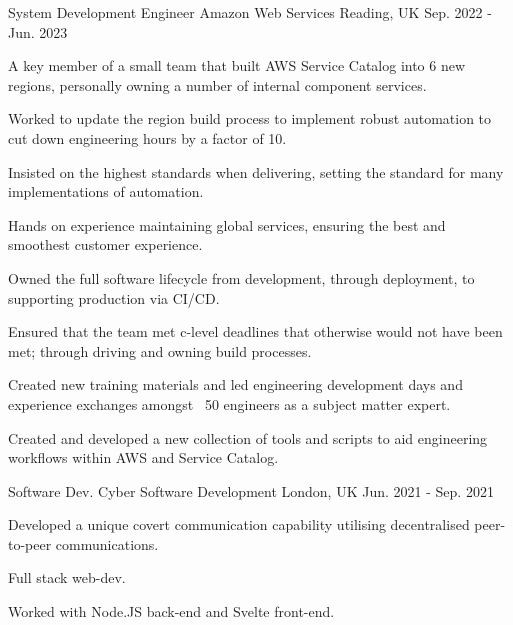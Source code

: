 \begin{cventries}
\cventry
{System Development Engineer} %
{Amazon Web Services} %
{Reading, UK} %
{Sep. 2022 - Jun. 2023} %
{ %
\begin{cvitems}
\item {A key member of a small team that built AWS Service Catalog into 6 new regions, personally owning a number of internal component services.}
\item {Worked to update the region build process to implement robust automation to cut down engineering hours by a factor of 10.}
\item {Insisted on the highest standards when delivering, setting the standard for many implementations of automation.}
\item {Hands on experience maintaining global services, ensuring the best and smoothest customer experience.}
\item {Owned the full software lifecycle from development, through deployment, to supporting production via CI/CD.}
\item {Ensured that the team met c-level deadlines that otherwise would not have been met; through driving and owning build processes.}
\item {Created new training materials and led engineering development days and experience exchanges amongst ~50 engineers as a subject matter expert.}
\item {Created and developed a new collection of tools and scripts to aid engineering workflows within AWS and Service Catalog.}
\end{cvitems}
}


\cventry
{Software Dev.} %
{Cyber Software Development} %
{London, UK} %
{Jun. 2021 - Sep. 2021} %
{ %
\begin{cvitems}
\item {Developed a unique covert communication capability utilising decentralised peer-to-peer communications.}
\item {Full stack web-dev.}
\item {Worked with Node.JS back-end and Svelte front-end.}
\end{cvitems}
}


\end{cventries}
